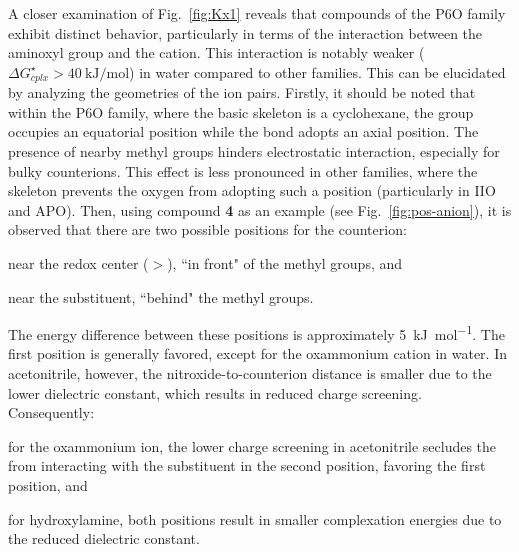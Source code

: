 \documentclass[review]{elsarticle}
\begin{document}
A closer examination of Fig.~\ref{fig:Kx1} reveals that compounds of the P6O family exhibit distinct behavior, particularly in terms of the interaction between the aminoxyl group and the cation. This interaction is notably weaker ($\Delta G^\star_{cplx} > \SI{40}{\kilo\joule\per\mole}$) in water compared to other families. This can be elucidated by analyzing the geometries of the ion pairs. 
Firstly, it should be noted that within the P6O family, where the basic skeleton is a cyclohexane, the  group occupies an equatorial position while the  bond adopts an axial position. The presence of nearby methyl groups hinders electrostatic interaction, especially for bulky counterions. This effect is less pronounced in other families, where the skeleton prevents the oxygen from adopting such a position (particularly in IIO and APO).
Then, using compound \textbf{4} as an example (see Fig.~\ref{fig:pos-anion}), it is observed that there are two possible positions for the counterion: 
\begin{inparaenum}[(i)]
	\item near the redox center ($>$), ``in front" of the methyl groups, and 
	\item near the substituent, ``behind" the methyl groups.
\end{inparaenum}
The energy difference between these positions is approximately \SI{5}{\kilo\joule\per\mole}. The first position is generally favored, except for the oxammonium cation in water. In acetonitrile, however, the nitroxide-to-counterion distance is smaller due to the lower dielectric constant, which results in reduced charge screening. Consequently:
\begin{inparaenum}[(i)]
	\item for the oxammonium ion, the lower charge screening in acetonitrile secludes the  from interacting with the substituent in the second position, favoring the first position, and
	\item for hydroxylamine, both positions result in smaller complexation energies due to the reduced dielectric constant.
\end{inparaenum}
\end{document}
